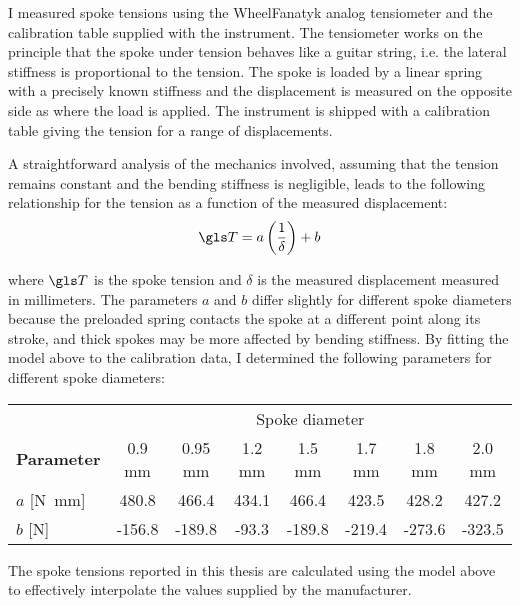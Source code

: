 \documentclass[../../thesis.tex]{subfiles}
\begin{document}
I measured spoke tensions using the WheelFanatyk analog tensiometer and the calibration table supplied with the instrument. The tensiometer works on the principle that the spoke under tension behaves like a guitar string, i.e. the lateral stiffness is proportional to the tension. The spoke is loaded by a linear spring with a precisely known stiffness and the displacement is measured on the opposite side as where the load is applied. The instrument is shipped with a calibration table giving the tension for a range of displacements.

A straightforward analysis of the mechanics involved, assuming that the tension remains constant and the bending stiffness is negligible, leads to the following relationship for the tension as a function of the measured displacement:
\begin{equation}
\T = a\left(\frac{1}{\delta}\right) + b
\end{equation}

where $\T$ is the spoke tension and $\delta$ is the measured displacement measured in millimeters. The parameters $a$ and $b$ differ slightly for different spoke diameters because the preloaded spring contacts the spoke at a different point along its stroke, and thick spokes may be more affected by bending stiffness. By fitting the model above to the calibration data, I determined the following parameters for different spoke diameters:

\begin{table}[h]
\begin{tabular}{lccccccc}
\toprule
&\multicolumn{7}{c}{Spoke diameter}\\
\cmidrule(r){2-8}
\bf Parameter & 0.9 mm & 0.95 mm & 1.2 mm & 1.5 mm & 1.7 mm & 1.8 mm & 2.0 mm\\
\midrule
$a$ [\si{N.mm}] &  480.8 &  466.4 & 434.1 &  466.4 &  423.5 &  428.2 &  427.2\\
$b$ [\si{N}]    & -156.8 & -189.8 & -93.3 & -189.8 & -219.4 & -273.6 & -323.5\\
\bottomrule
\end{tabular}
\end{table}

The spoke tensions reported in this thesis are calculated using the model above to effectively interpolate the values supplied by the manufacturer.
\end{document}
